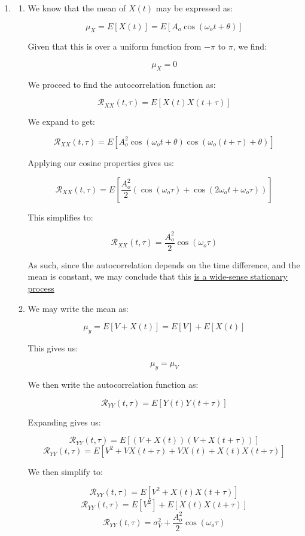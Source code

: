 \begin{enumerate}
  \item

    \begin{enumerate}

      \item We know that the mean of $X(t)$ may be expressed as:

        $$\mu_X=E[X(t)]=E[A_o\cos(\omega_ot+\theta)]$$

        Given that this is over a uniform function from $-\pi$ to $\pi$, we find:

        $$\boxed{\mu_X=0}$$

        We proceed to find the autocorrelation function as:

        $$\mathcal{R}_{XX}(t,\tau)=E[X(t)X(t+\tau)]$$

        We expand to get:

        $$\mathcal{R}_{XX}(t,\tau)=E[A_o^2\cos(\omega_o t+\theta)\cos(\omega_o (t+\tau)+\theta)]$$

        Applying our cosine properties gives us:

        $$\mathcal{R}_{XX}(t,\tau)=E\left[\frac{A_o^2}{2}(\cos(\omega_o\tau)+\cos(2\omega_ot+\omega_o\tau))\right]$$

        This simplifies to:

        $$\boxed{\mathcal{R}_{XX}(t,\tau)=\frac{A_o^2}{2}\cos(\omega_o\tau)}$$

        As such, since the autocorrelation depends on the time difference, and the mean is constant, we may conclude that this \underline{is a wide-sense stationary process}

      \item We may write the mean as:

        $$\mu_y=E[V+X(t)]=E[V]+E[X(t)]$$

        This gives us:

        $$\boxed{\mu_y=\mu_V}$$

        We then write the autocorrelation function as:

        $$\mathcal{R}_{YY}(t,\tau)=E[Y(t)Y(t+\tau)]$$

        Expanding gives us:

        $$\mathcal{R}_{YY}(t,\tau)=E[(V+X(t))(V+X(t+\tau))]$$
        $$\mathcal{R}_{YY}(t,\tau)=E[V^2+VX(t+\tau)+VX(t)+X(t)X(t+\tau)]$$

        We then simplify to:

        $$\mathcal{R}_{YY}(t,\tau)=E[V^2+X(t)X(t+\tau)]$$
        $$\mathcal{R}_{YY}(t,\tau)=E[V^2]+E[X(t)X(t+\tau)]$$
        $$\boxed{\mathcal{R}_{YY}(t,\tau)=\sigma_V^2+\frac{A_o^2}{2}\cos(\omega_o\tau)}$$


\end{enumerate}
\end{enumerate}
